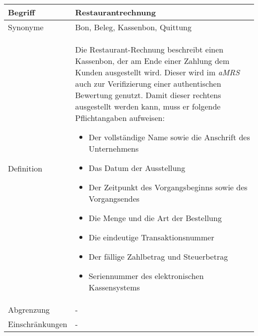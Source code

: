 \begin{table}[H]
    \centering
    \label{gls:restaurantRechnung}
    \begin{tabularx}{\textwidth}{| l | X |}
        \hline
        Begriff         & Restaurantrechnung                                                                                                                                                                                                                                                                             \\
        \hline
        Synonyme        & Bon, Beleg, Kassenbon, Quittung                                                                                                                                                                                                                                                                 \\
        \hline
        Definition      & Die Restaurant-Rechnung beschreibt einen Kassenbon, der am Ende einer Zahlung dem Kunden ausgestellt wird. Dieser wird im \textit{aMRS} auch zur Verifizierung einer authentischen Bewertung genutzt. Damit dieser rechtens ausgestellt werden kann, muss er folgende Pflichtangaben aufweisen:
        \begin{itemize}
            \item Der vollständige Name sowie die Anschrift des Unternehmens
            \item Das Datum der Ausstellung
            \item Der Zeitpunkt des Vorgangsbeginns sowie des Vorgangsendes
            \item Die Menge und die Art der Bestellung
            \item Die eindeutige Transaktionsnummer
            \item Der fällige Zahlbetrag und Steuerbetrag
            \item Seriennummer des elektronischen Kassensystems \autocite{bernhard_kostler_kassenbon-pflicht_2022}
        \end{itemize}
        \\
        \hline
        Abgrenzung      & -                                                                                                                                                                                                                                                                                               \\
        \hline
        Einschränkungen & -                                                                                                                                                                                                                                                                                               \\

\end{tabularx}
\end{table}
